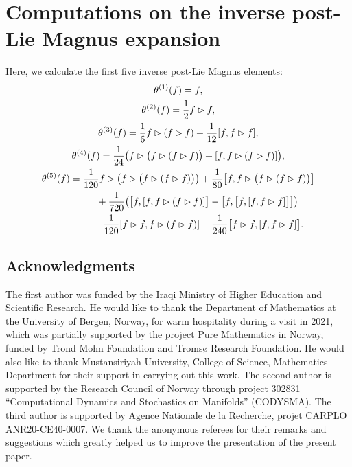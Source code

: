 \documentclass[10pt,a4paper]{amsart}
\numberwithin{equation}{section}
\begin{document}
\section{Computations on the inverse post-Lie Magnus expansion}
\label{C.ipl-Magnus}
Here, we calculate the first five inverse post-Lie Magnus elements:
\begin{gather*}
\theta^{(1)}(f) = f,
\\
\theta^{(2)}(f) = \frac{1}{2} f \rhd f ,
\\
\theta^{(3)}(f) = \frac{1}{6} f \rhd (f \rhd f) + \frac{1}{12} [f, f \rhd f] ,
\\
\theta^{(4)}(f) = \frac{1}{24} \big( f \rhd \big(f \rhd (f \rhd f)\big) + [f, f \rhd (f \rhd f)] \big),
\\
\theta^{(5)}(f) = \frac{1}{120} f \rhd \big( f \rhd \big(f \rhd (f \rhd f)\big)\big) + \frac{1}{80} \big[f, f \rhd \big(f \rhd (f \rhd f)\big)\big]
\\ \hphantom{\theta^{(5)}(f) =}
{}+ \frac{1}{720} \big( \big[f, [f, f \rhd (f \rhd f)]\big] - \big[f, \big[f, [f, f \rhd f]\big]\big]\big)
\\ \hphantom{\theta^{(5)}(f) =}
{}+ \frac{1}{120} [f \rhd f, f \rhd (f \rhd f)] - \frac{1}{240} \big[f \rhd f, [f, f \rhd f]\big].
\end{gather*}

\subsection*{Acknowledgments} The first author was funded by the Iraqi Ministry of Higher Education and Scientific Research. He would like to thank the Department of Mathematics at the University of Bergen, Norway, for warm hospitality during a visit in 2021, which was partially supported by the project Pure Mathematics in Norway, funded by Trond Mohn Foundation and Troms{\o} Research Foundation.
He would also like to thank Mustansiriyah University, College of Science, Mathematics Department for their support in carrying out this work. The second author is supported by the Research Council of Norway through project 302831 ``Computational Dynamics and Stochastics on Manifolds'' (CODYSMA). The third author is supported by Agence Nationale de la Recherche, projet CARPLO ANR20-CE40-0007. We thank the anonymous referees for their remarks and suggestions which greatly helped us to improve the presentation of the present paper.

\end{document}
